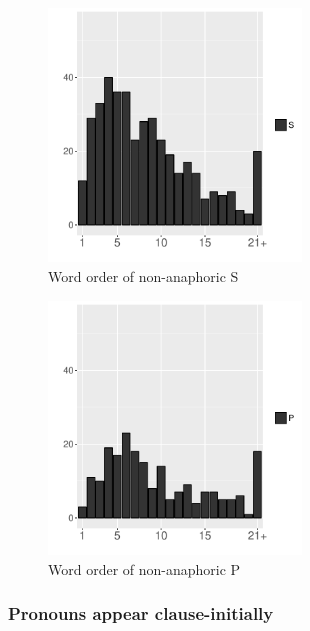 \begin{figure}
	\begin{center}
	\includegraphics[width=0.6\textwidth]{figure/WOSNew.pdf}
	\caption{Word order of non-anaphoric S}
	\label{WOSNewF}
	\end{center}
\end{figure}
\begin{figure}
	\begin{center}
	\includegraphics[width=0.6\textwidth]{figure/WOPNew.pdf}
	\caption{Word order of non-anaphoric P}
	\label{WOPNewF}
	\end{center}
\end{figure}

\subsubsection{Pronouns appear clause-initially}\label{WO:ClauseInit:Ident:Pron}

